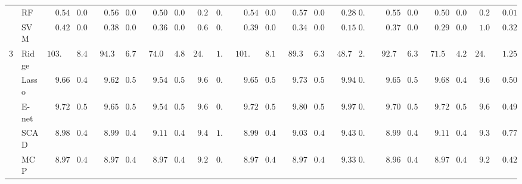 \begin{tabular}{p{0.2cm}p{1cm}|p{0.6cm}p{0.6cm}|p{0.6cm}p{0.6cm}p{0.6cm}p{0.6cm}p{0.6cm}p{0.6cm}|p{0.6cm}p{0.6cm}p{0.6cm}p{0.6cm}p{0.6cm}p{0.6cm}|p{0.6cm}p{0.6cm}p{0.6cm}p{0.6cm}p{0.6cm}p{0.6cm}}
 & RF  & $\phantom{00}0.54$ & $\phantom{0}0.02$ & $\phantom{00}0.56$ & $\phantom{0}0.02$ & $\phantom{00}0.50$ & $\phantom{0}0.02$ & $\phantom{0}0.28$ & $0.01$ & $\phantom{00}0.54$ & $\phantom{0}0.02$ & $\phantom{00}0.57$ & $\phantom{0}0.02$ & $\phantom{00}0.28$ & $0.01$ & $\phantom{00}0.55$ & $\phantom{0}0.02$ & $\phantom{00}0.50$ & $\phantom{0}0.02$ & $\phantom{0}0.27$ & $\phantom{0}0.01$ \\
 & SVM  & $\phantom{00}0.42$ & $\phantom{0}0.05$ & $\phantom{00}0.38$ & $\phantom{0}0.06$ & $\phantom{00}0.36$ & $\phantom{0}0.05$ & $\phantom{0}0.67$ & $0.08$ & $\phantom{00}0.39$ & $\phantom{0}0.05$ & $\phantom{00}0.34$ & $\phantom{0}0.04$ & $\phantom{00}0.15$ & $0.01$ & $\phantom{00}0.37$ & $\phantom{0}0.05$ & $\phantom{00}0.29$ & $\phantom{0}0.03$ & $\phantom{0}1.02$ & $\phantom{0}0.32$ \\\hline
3 & Ridge  & $103.60$ & $\phantom{0}8.48$ & $\phantom{0}94.37$ & $\phantom{0}6.77$ & $\phantom{0}74.04$ & $\phantom{0}4.85$ & $24.97$ & $1.21$ & $101.17$ & $\phantom{0}8.14$ & $\phantom{0}89.35$ & $\phantom{0}6.30$ & $\phantom{0}48.73$ & $2.19$ & $\phantom{0}92.71$ & $\phantom{0}6.31$ & $\phantom{0}71.54$ & $\phantom{0}4.28$ & $24.75$ & $\phantom{0}1.25$ \\
 & Lasso  & $\phantom{00}9.66$ & $\phantom{0}0.49$ & $\phantom{00}9.62$ & $\phantom{0}0.50$ & $\phantom{00}9.54$ & $\phantom{0}0.51$ & $\phantom{0}9.64$ & $0.47$ & $\phantom{00}9.65$ & $\phantom{0}0.50$ & $\phantom{00}9.73$ & $\phantom{0}0.51$ & $\phantom{00}9.94$ & $0.62$ & $\phantom{00}9.65$ & $\phantom{0}0.51$ & $\phantom{00}9.68$ & $\phantom{0}0.49$ & $\phantom{0}9.61$ & $\phantom{0}0.50$ \\
 & E-net  & $\phantom{00}9.72$ & $\phantom{0}0.50$ & $\phantom{00}9.65$ & $\phantom{0}0.51$ & $\phantom{00}9.54$ & $\phantom{0}0.51$ & $\phantom{0}9.69$ & $0.47$ & $\phantom{00}9.72$ & $\phantom{0}0.52$ & $\phantom{00}9.80$ & $\phantom{0}0.53$ & $\phantom{00}9.97$ & $0.63$ & $\phantom{00}9.70$ & $\phantom{0}0.51$ & $\phantom{00}9.72$ & $\phantom{0}0.51$ & $\phantom{0}9.66$ & $\phantom{0}0.49$ \\
 & SCAD  & $\phantom{00}8.98$ & $\phantom{0}0.41$ & $\phantom{00}8.99$ & $\phantom{0}0.40$ & $\phantom{00}9.11$ & $\phantom{0}0.42$ & $\phantom{0}9.45$ & $1.10$ & $\phantom{00}8.99$ & $\phantom{0}0.41$ & $\phantom{00}9.03$ & $\phantom{0}0.41$ & $\phantom{00}9.43$ & $0.85$ & $\phantom{00}8.99$ & $\phantom{0}0.41$ & $\phantom{00}9.11$ & $\phantom{0}0.42$ & $\phantom{0}9.32$ & $\phantom{0}0.77$ \\
 & MCP  & $\phantom{00}8.97$ & $\phantom{0}0.41$ & $\phantom{00}8.97$ & $\phantom{0}0.40$ & $\phantom{00}8.97$ & $\phantom{0}0.41$ & $\phantom{0}9.26$ & $0.41$ & $\phantom{00}8.97$ & $\phantom{0}0.41$ & $\phantom{00}8.97$ & $\phantom{0}0.41$ & $\phantom{00}9.33$ & $0.42$ & $\phantom{00}8.96$ & $\phantom{0}0.41$ & $\phantom{00}8.97$ & $\phantom{0}0.41$ & $\phantom{0}9.26$ & $\phantom{0}0.42$ \\

\end{tabular}
